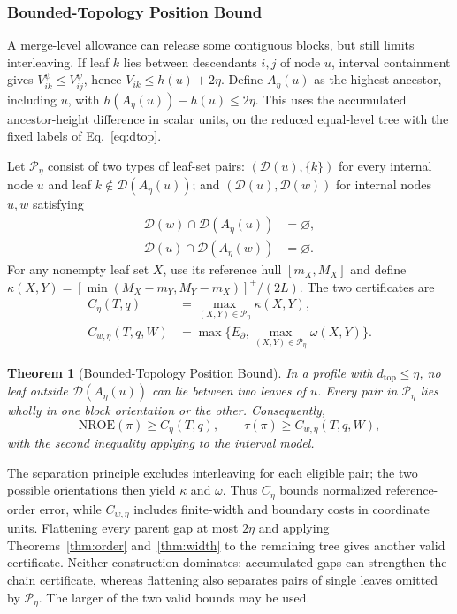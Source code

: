 \documentclass[review]{vgtc}
\newtheorem{theorem}{Theorem}
\newcommand{\dtop}{d_{\mathrm{top}}}
\newcommand{\nroe}{\mathrm{NROE}}
\begin{document}


\subsubsection{Bounded-Topology Position Bound}
A merge-level allowance can release some contiguous blocks, but still limits interleaving. If leaf $k$ lies between descendants $i,j$ of node $u$, interval containment gives $V_{ik}^{\psi}\le V_{ij}^{\psi}$, hence $V_{ik}\le h(u)+2\eta$. Define $A_\eta(u)$ as the highest ancestor, including $u$, with $h(A_\eta(u))-h(u)\le2\eta$. This uses the accumulated ancestor-height difference in scalar units, on the reduced equal-level tree with the fixed labels of Eq.~\ref{eq:dtop}.

Let $\mathcal{P}_\eta$ consist of two types of leaf-set pairs: $(\mathcal{D}(u),\{k\})$ for every internal node $u$ and leaf $k\notin\mathcal{D}(A_\eta(u))$; and $(\mathcal{D}(u),\mathcal{D}(w))$ for internal nodes $u,w$ satisfying
\begin{equation}\label{eq:separatedpairs}
\begin{aligned}
 \mathcal{D}(w)\cap\mathcal{D}(A_\eta(u))&=\varnothing,\\
 \mathcal{D}(u)\cap\mathcal{D}(A_\eta(w))&=\varnothing.
\end{aligned}
\end{equation}
For any nonempty leaf set $X$, use its reference hull $[m_X,M_X]$ and define $\kappa(X,Y)=[\min(M_X-m_Y,M_Y-m_X)]^+/(2L)$. The two certificates are
\begin{equation}\label{eq:chaindef}
\begin{aligned}
 C_\eta(T,q)&=\max_{(X,Y)\in\mathcal{P}_\eta}\kappa(X,Y),\\
 C_{w,\eta}(T,q,W)&=\max\{E_\partial,\max_{(X,Y)\in\mathcal{P}_\eta}\omega(X,Y)\}.
\end{aligned}
\end{equation}
\begin{theorem}[Bounded-Topology Position Bound]\label{thm:chain}
In a profile with $\dtop\le\eta$, no leaf outside $\mathcal{D}(A_\eta(u))$ can lie between two leaves of $u$. Every pair in $\mathcal{P}_\eta$ lies wholly in one block orientation or the other. Consequently,
\begin{equation}\label{eq:chainbounds}
 \nroe(\pi)\ge C_\eta(T,q),\qquad
 \tau(\pi)\ge C_{w,\eta}(T,q,W),
\end{equation}
with the second inequality applying to the interval model.
\end{theorem}
The separation principle excludes interleaving for each eligible pair; the two possible orientations then yield $\kappa$ and $\omega$. Thus $C_\eta$ bounds normalized reference-order error, while $C_{w,\eta}$ includes finite-width and boundary costs in coordinate units. Flattening every parent gap at most $2\eta$ and applying Theorems~\ref{thm:order} and~\ref{thm:width} to the remaining tree gives another valid certificate. Neither construction dominates: accumulated gaps can strengthen the chain certificate, whereas flattening also separates pairs of single leaves omitted by $\mathcal{P}_\eta$. The larger of the two valid bounds may be used.
\end{document}
